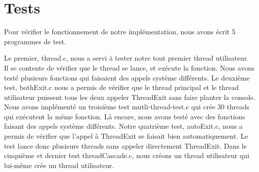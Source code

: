\documentclass[11pt]{article}
\begin{document}
\section {Tests}

Pour vérifier le fonctionnement de notre implémentation, nous avons écrit 5 programmes de test.

Le premier, \textcolor{vert2}{thread.c}, nous a servi à tester notre tout premier thread utilisateur. Il se contente de vérifier que le thread se lance, et exécute la fonction. Nous avons testé plusieurs fonctions qui faisaient des appels système différents.
\newline
Le deuxième test, \textcolor{vert2}{bothExit.c} nous a permis de vérifier que le thread principal et le thread utilisateur puissent tous les deux appeler \textcolor{blue2}{ThreadExit} sans faire planter la console.
\newline
Nous avons implémenté un troisième test \textcolor{vert2}{mutli-thread-test.c} qui crée 30 threads qui exécutent la même fonction. Là encore, nous avons testé avec des fonctions faisant des appels système différents.
\newline
Notre quatrième test, \textcolor{vert2}{autoExit.c}, nous a permis de vérifier que l'appel à \textcolor{blue2}{ThreadExit} se faisait bien automatiquement. Le test lance donc plusieurs threads sans appeler directement \textcolor{blue2}{ThreadExit}.
\newline
Dans le cinquième et dernier test \textcolor{vert2}{threadCascade.c}, nous créons un thread utilisateur qui lui-même crée un thread utilisateur.
\end{document}
